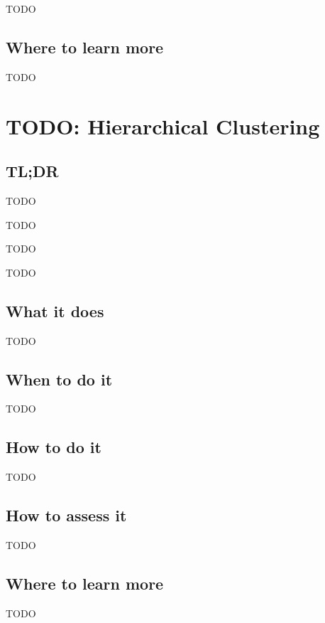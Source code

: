 \documentclass[
]{book}
\providecommand{\tightlist}{%
  \setlength{\itemsep}{0pt}\setlength{\parskip}{0pt}}
\begin{document}
TODO

\hypertarget{where-to-learn-more-22}{%
\section{Where to learn more}\label{where-to-learn-more-22}}

TODO

\hypertarget{hierarchical-clustering}{%
\chapter{TODO: Hierarchical Clustering}\label{hierarchical-clustering}}

\hypertarget{tldr-23}{%
\section{TL;DR}\label{tldr-23}}

\begin{description}
\tightlist
\item[What it does]
TODO
\item[When to do it]
TODO
\item[How to do it]
TODO
\item[How to assess it]
TODO
\end{description}

\hypertarget{what-it-does-23}{%
\section{What it does}\label{what-it-does-23}}

TODO

\hypertarget{when-to-do-it-23}{%
\section{When to do it}\label{when-to-do-it-23}}

TODO

\hypertarget{how-to-do-it-23}{%
\section{How to do it}\label{how-to-do-it-23}}

TODO

\hypertarget{how-to-assess-it-23}{%
\section{How to assess it}\label{how-to-assess-it-23}}

TODO

\hypertarget{where-to-learn-more-23}{%
\section{Where to learn more}\label{where-to-learn-more-23}}

TODO

  
\end{document}
